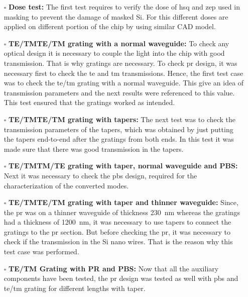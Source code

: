\documentclass[../report.tex]{subfiles}
\begin{document}
\begin{itemize}[leftmargin=*]
	\item[$\square$] \textbf{Dose test:} The first test requires to verify the dose of \gls{hsq} and \gls{zep} used in masking to prevent the damage of masked Si. For this different doses are applied on different portion of the chip by using similar CAD model.
			
	\item[$\square$] \textbf{TE/TM\textemdash TE/TM grating with a normal waveguide:} To check any optical design it is necessary to couple the light into the chip with good transmission. That is why gratings are necessary. To check \gls{pr} design, it was necessary first to check the \gls{te} and \gls{tm} transmissions. Hence, the first test case was to check the \gls{te}/\gls{tm} grating with a normal waveguide. This give an idea of transmission parameters and the next results were referenced to this value. This test ensured that the gratings worked as intended. 
	
	\item[$\square$] \textbf{TE/TM\textemdash TE/TM grating with tapers:} The next test was to check the transmission parameters of the tapers, which was obtained by just putting the tapers end-to-end after the gratings from both ends. In this test it was made sure that there was good transmission in the tapers.
	
	\item[$\square$] \textbf{TE/TM\textemdash TM/TE grating with taper, normal waveguide and PBS:} Next it was necessary to check the \gls{pbs} design,  required for the characterization of the converted modes.
	
	\item[$\square$] \textbf{TE/TM\textemdash TE/TM grating with taper and thinner waveguide:} Since, the \gls{pr} was on a thinner waveguide of thickness \SI{230}{\nano \meter} whereas the gratings had a thickness of \SI{1200}{\nano \meter}, it was necessary to use tapers to connect the gratings to the \gls{pr} section. But before checking the \gls{pr}, it was necessary to check if the transmission in the Si nano wires. That is the reason why this test case was performed. 
	
	\item[$\square$] \textbf{TE/TM Grating with PR and PBS:} Now that all the auxiliary components have been tested, the \gls{pr} design was tested as well with \gls{pbs} and \gls{te}/\gls{tm} grating for different lengths with taper.
	

\end{itemize}
\end{document}
